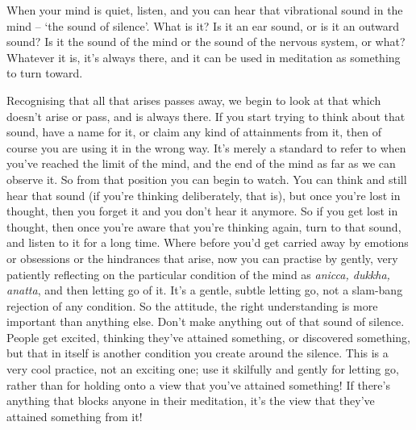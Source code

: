 
When your mind is quiet, listen, and you can hear that vibrational sound in the mind -- `the sound of silence'. What is it? Is it an ear sound, or is it an outward sound? Is it the sound of the mind or the sound of the nervous system, or what? Whatever it is, it's always there, and it can be used in meditation as something to turn toward.

Recognising that all that arises passes away, we begin to look at that which doesn't arise or pass, and is always there. If you start trying to think about that sound, have a name for it, or claim any kind of attainments from it, then of course you are using it in the wrong way. It's merely a standard to refer to when you've reached the limit of the mind, and the end of the mind as far as we can observe it. So from that position you can begin to watch. You can think and still hear that sound (if you're thinking deliberately, that is), but once you're lost in thought, then you forget it and you don't hear it anymore. So if you get lost in thought, then once you're aware that you're thinking again, turn to that sound, and listen to it for a long time. Where before you'd get carried away by emotions or obsessions or the hindrances that arise, now you can practise by gently, very patiently reflecting on the particular condition of the mind as \textit{anicca, dukkha, anatta}, and then letting go of it. It's a gentle, subtle letting go, not a slam-bang rejection of any condition. So the attitude, the right understanding is more important than anything else. Don't make anything out of that sound of silence. People get excited, thinking they've attained something, or discovered something, but that in itself is another condition you create around the silence. This is a very cool practice, not an exciting one; use it skilfully and gently for letting go, rather than for holding onto a view that you've attained something! If there's anything that blocks anyone in their meditation, it's the view that they've attained something from it!

